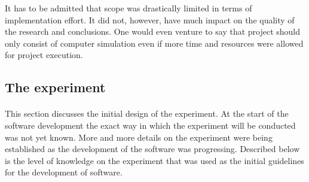\documentclass[11pt,english]{article}
\begin{document}
It has to be admitted that scope was drastically limited in terms of implementation effort. It did not, however, have much impact on the quality of the research and conclusions. One would even venture to say that project should only consist of computer simulation even if more time and resources were allowed for project execution. 






\subsection{The experiment}

\paragraph{}

This section discusses the initial design of the experiment. At the start of the software development the exact way in which the experiment will be conducted was not yet known. More and more details on the experiment were being established as the development of the software was progressing. Described below is the level of knowledge on the experiment that was used as the initial guidelines for the development of software.

\par
















\end{document}
